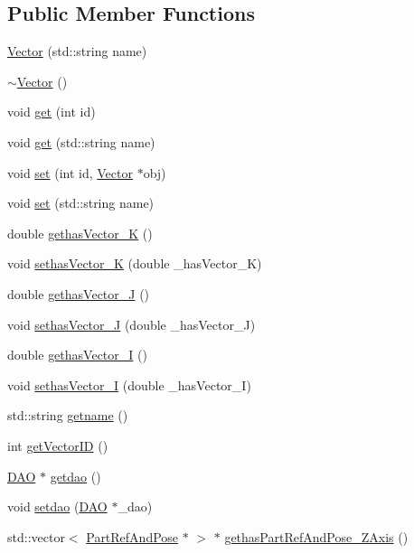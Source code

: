 \subsection*{Public Member Functions}
\begin{DoxyCompactItemize}
\item 
\hyperlink{class_vector_a9999305db06d6630ef4ea6d05c4992e2}{Vector} (std::string name)
\item 
\hyperlink{class_vector_a2eb3c49587a4f12cade7895ccb73f6a0}{$\sim$Vector} ()
\item 
void \hyperlink{class_vector_ad325eaf33ebd1ca02ba082f172601a4f}{get} (int id)
\item 
void \hyperlink{class_vector_a7ee6ab6d31fbcdb8bd48dd030e30a1af}{get} (std::string name)
\item 
void \hyperlink{class_vector_a3e7152cb4671094433d529aea23897d0}{set} (int id, \hyperlink{class_vector}{Vector} $\ast$obj)
\item 
void \hyperlink{class_vector_a41a1d931298f149ca5433331da53a765}{set} (std::string name)
\item 
double \hyperlink{class_vector_a1023139e44d22a40f183491d2647a2db}{gethasVector\_\-K} ()
\item 
void \hyperlink{class_vector_ada646c7621c5f50b18be452ba21b44f3}{sethasVector\_\-K} (double \_\-hasVector\_\-K)
\item 
double \hyperlink{class_vector_aa5dcf1105a3c7be3fdc518a17885abc4}{gethasVector\_\-J} ()
\item 
void \hyperlink{class_vector_af25139fca3f587d49b4c554df12081a0}{sethasVector\_\-J} (double \_\-hasVector\_\-J)
\item 
double \hyperlink{class_vector_abab0fbba3254e2dc15eeb6736b8321ae}{gethasVector\_\-I} ()
\item 
void \hyperlink{class_vector_a887d65f00601e863e2788c4f09a7e294}{sethasVector\_\-I} (double \_\-hasVector\_\-I)
\item 
std::string \hyperlink{class_vector_abf0dfbf85e6c8431b15fe58885ab33fc}{getname} ()
\item 
int \hyperlink{class_vector_a429e3cef2e5c1babc17c34226928c1d2}{getVectorID} ()
\item 
\hyperlink{class_d_a_o}{DAO} $\ast$ \hyperlink{class_vector_ab6ce67669fa54699473f2754227a224c}{getdao} ()
\item 
void \hyperlink{class_vector_a164215fcc47e016d863562eb5ff93524}{setdao} (\hyperlink{class_d_a_o}{DAO} $\ast$\_\-dao)
\item 
std::vector$<$ \hyperlink{class_part_ref_and_pose}{PartRefAndPose} $\ast$ $>$ $\ast$ \hyperlink{class_vector_aaca603b4096b9aeb3693cc5e58056a51}{gethasPartRefAndPose\_\-ZAxis} ()

\end{DoxyCompactItemize}
